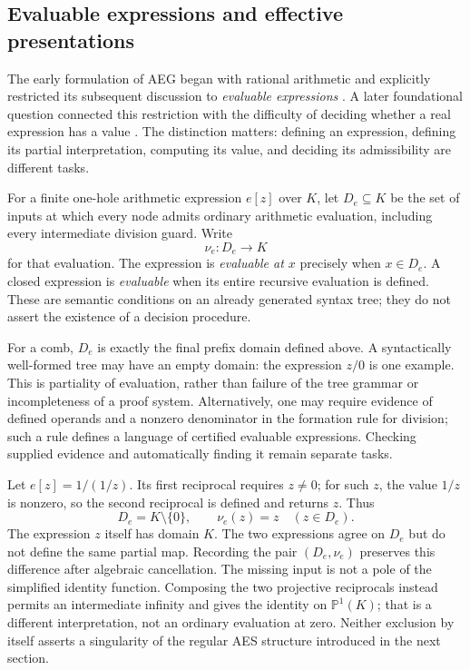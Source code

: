 \subsection{Evaluable expressions and effective presentations}
\label{subsec:p0-evaluation-effectivity}

The early formulation of AEG began with rational arithmetic and explicitly
restricted its subsequent discussion to \emph{evaluable expressions}
\cite{Yuan2022AEGEvaluableExpressions}.  A later foundational question connected
this restriction with the difficulty of deciding whether a real expression
has a value \cite{Yuan2023AEGFoundationalProblem}.  The distinction matters:
defining an expression, defining its partial interpretation, computing its
value, and deciding its admissibility are different tasks.

\begin{definition}
\label{def:p0-evaluable-expression}
For a finite one-hole arithmetic expression $e[z]$ over $K$, let $D_e\subseteq K$
be the set of inputs at which every node admits ordinary arithmetic
evaluation, including every intermediate division guard.  Write
\[
  \nu_e:D_e\longrightarrow K
\]
for that evaluation.  The expression is \emph{evaluable at $x$} precisely when
$x\in D_e$.  A closed expression is \emph{evaluable} when its entire recursive
evaluation is defined.  These are semantic conditions on an already generated
syntax tree; they do not assert the existence of a decision procedure.
\end{definition}

For a comb, $D_e$ is exactly the final prefix domain defined above.  A
syntactically well-formed tree may have an empty domain: the expression
$z/0$ is one example.  This is partiality of evaluation, rather than failure
of the tree grammar or incompleteness of a proof system.  Alternatively, one
may require evidence of defined operands and a nonzero denominator in the
formation rule for division; such a rule defines a language of certified
evaluable expressions.  Checking supplied evidence and automatically finding
it remain separate tasks.

\begin{example}
\label{ex:p0-cancelled-reciprocal-domain}
Let $e[z]=1/(1/z)$.  Its first reciprocal requires $z\ne0$; for such $z$, the
value $1/z$ is nonzero, so the second reciprocal is defined and returns $z$.
Thus
\[
  D_e=K\setminus\{0\},\qquad \nu_e(z)=z\quad(z\in D_e).
\]
The expression $z$ itself has domain $K$.  The two expressions agree on $D_e$
but do not define the same partial map.  Recording the pair $(D_e,\nu_e)$
preserves this difference after algebraic cancellation.  The missing input is
not a pole of the simplified identity function.  Composing the two projective
reciprocals instead permits an intermediate infinity and gives the identity
on $\mathbb P^1(K)$; that is a different interpretation, not an ordinary
evaluation at zero.  Neither exclusion by itself asserts a singularity of
the regular AES structure introduced in the next section.
\end{example}

